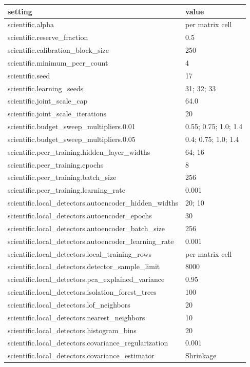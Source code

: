 \begin{tabular}{ll}
\toprule
setting & value \\
\midrule
scientific.alpha & per matrix cell \\
scientific.reserve\_fraction & 0.5 \\
scientific.calibration\_block\_size & 250 \\
scientific.minimum\_peer\_count & 4 \\
scientific.seed & 17 \\
scientific.learning\_seeds & 31; 32; 33 \\
scientific.joint\_scale\_cap & 64.0 \\
scientific.joint\_scale\_iterations & 20 \\
scientific.budget\_sweep\_multipliers.0.01 & 0.55; 0.75; 1.0; 1.4 \\
scientific.budget\_sweep\_multipliers.0.05 & 0.4; 0.75; 1.0; 1.4 \\
scientific.peer\_training.hidden\_layer\_widths & 64; 16 \\
scientific.peer\_training.epochs & 8 \\
scientific.peer\_training.batch\_size & 256 \\
scientific.peer\_training.learning\_rate & 0.001 \\
scientific.local\_detectors.autoencoder\_hidden\_widths & 20; 10 \\
scientific.local\_detectors.autoencoder\_epochs & 30 \\
scientific.local\_detectors.autoencoder\_batch\_size & 256 \\
scientific.local\_detectors.autoencoder\_learning\_rate & 0.001 \\
scientific.local\_detectors.local\_training\_rows & per matrix cell \\
scientific.local\_detectors.detector\_sample\_limit & 8000 \\
scientific.local\_detectors.pca\_explained\_variance & 0.95 \\
scientific.local\_detectors.isolation\_forest\_trees & 100 \\
scientific.local\_detectors.lof\_neighbors & 20 \\
scientific.local\_detectors.nearest\_neighbors & 10 \\
scientific.local\_detectors.histogram\_bins & 20 \\
scientific.local\_detectors.covariance\_regularization & 0.001 \\
scientific.local\_detectors.covariance\_estimator & Shrinkage \\

\end{tabular}
